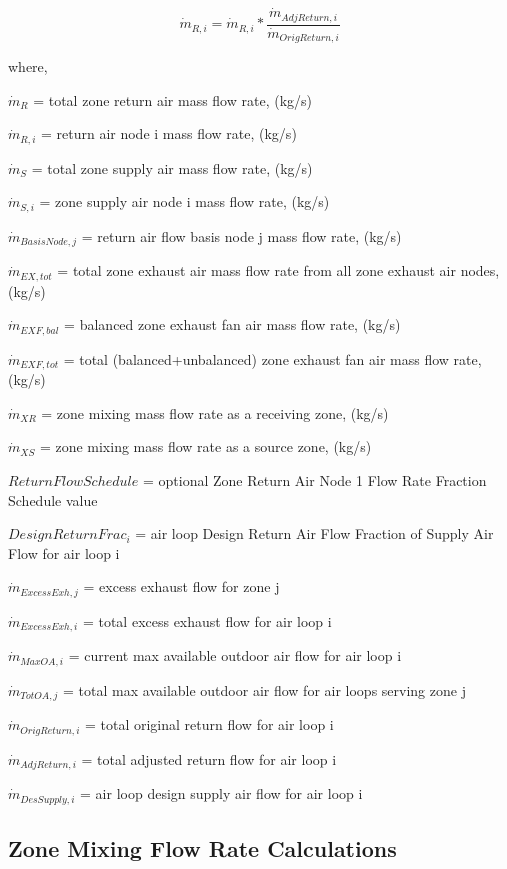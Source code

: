 \begin{equation}
{\dot m_{R,i}} = {\dot m_{R,i}} * \frac{\dot m_{AdjReturn,i}} {\dot m_{OrigReturn,i}}
\end{equation}

where,

\({\dot m_{R}}\) = total zone return air mass flow rate, (kg/s)

\({\dot m_{R,i}}\) = return air node i mass flow rate, (kg/s)

\({\dot m_{S}}\) = total zone supply air mass flow rate, (kg/s)

\({\dot m_{S,i}}\) = zone supply air node i mass flow rate, (kg/s)

\({\dot m_{Basis Node,j}}\) = return air flow basis node j mass flow rate, (kg/s)

\({\dot m_{EX,tot}}\) = total zone exhaust air mass flow rate from all zone exhaust air nodes, (kg/s)

\({\dot m_{EXF,bal}}\) = balanced zone exhaust fan air mass flow rate, (kg/s)

\({\dot m_{EXF,tot}}\) = total (balanced+unbalanced) zone exhaust fan air mass flow rate, (kg/s)

\({\dot m_{XR}}\) = zone mixing mass flow rate as a receiving zone, (kg/s)

\({\dot m_{XS}}\) = zone mixing mass flow rate as a source zone, (kg/s)

\(ReturnFlowSchedule\) = optional Zone Return Air Node 1 Flow Rate Fraction Schedule value

\({DesignReturnFrac_i}\) = air loop Design Return Air Flow Fraction of Supply Air Flow for air loop i

\(\dot m_{ExcessExh,j}\) = excess exhaust flow for zone j

\(\dot m_{ExcessExh,i}\) = total excess exhaust flow for air loop i

\(\dot m_{MaxOA,i}\) = current max available outdoor air flow for air loop i

\(\dot m_{TotOA,j}\) = total max available outdoor air flow for air loops serving zone j

\(\dot m_{OrigReturn,i}\) = total original return flow for air loop i

\(\dot m_{AdjReturn,i}\) = total adjusted return flow for air loop i

\(\dot m_{DesSupply,i}\) = air loop design supply air flow for air loop i

\subsection{Zone Mixing Flow Rate Calculations}\label{zone-mixing-flow-rate-calculations}

